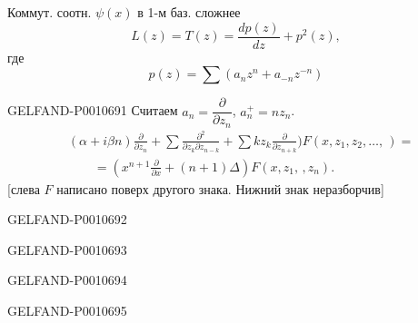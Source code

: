 Коммут. соотн. $\psi(x)$ в 1-м баз. сложнее
\begin{equation*}
L(z)=T(z)=\frac{dp(z)}{dz}+p^2(z),
\end{equation*}
где
\begin{equation*}
p(z)=\sum(a_nz^n+a_{-n}z^{-n})
\end{equation*}


\begin{GelfandAdjacentEvidence}{GELFAND-P001069}{1}
Считаем $a_n=\dfrac{\partial}{\partial z_n}$, $a_n^+=nz_n$.
\begin{equation*}
\begin{aligned}
&(\alpha+i\beta n)\frac{\partial}{\partial z_n}
+\sum\frac{\partial^2}{\partial z_k\partial z_{n-k}}
+\sum kz_k\frac{\partial}{\partial z_{n+k}}\biggr)
F(x,z_1,z_2,\ldots,\,) =\\
&\qquad=\left(x^{n+1}\frac{\partial}{\partial x}+(n+1)\Delta\right)F(x,z_1,\, ,z_n).
\end{aligned}
\end{equation*}
[слева \(F\) написано поверх другого знака. Нижний знак неразборчив]
\end{GelfandAdjacentEvidence}
\begin{GelfandAdjacentEvidence}{GELFAND-P001069}{2}

\end{GelfandAdjacentEvidence}
\begin{GelfandAdjacentEvidence}{GELFAND-P001069}{3}

\end{GelfandAdjacentEvidence}
\begin{GelfandAdjacentEvidence}{GELFAND-P001069}{4}

\end{GelfandAdjacentEvidence}
\begin{GelfandAdjacentEvidence}{GELFAND-P001069}{5}

\end{GelfandAdjacentEvidence}



